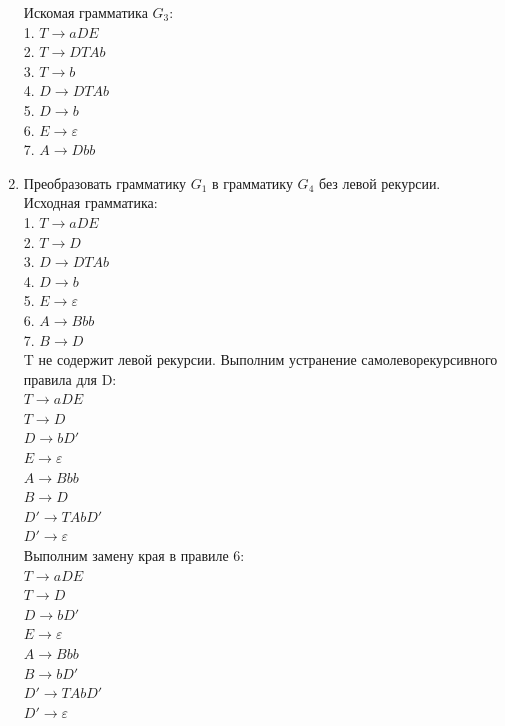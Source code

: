 \documentclass[a4paper,14pt]{extarticle}
\begin{document}
\begin{enumerate}[1.]
Искомая грамматика $G_3$:\\
1. $T \rightarrow aDE$\\
2. $T \rightarrow DTAb$\\
3. $T \rightarrow b$\\
4. $D \rightarrow DTAb$\\
5. $D \rightarrow b$\\
6. $E \rightarrow \varepsilon$\\
7. $A \rightarrow Dbb$\\

\item Преобразовать грамматику $G_1$ в грамматику $G_4$ без левой рекурсии.\\

Исходная грамматика:\\
1. $T \rightarrow aDE$\\
2. $T \rightarrow D$\\
3. $D \rightarrow DTAb$\\
4. $D \rightarrow b$\\
5. $E \rightarrow \varepsilon$\\
6. $A \rightarrow Bbb$\\
7. $B \rightarrow D$\\

T не содержит левой рекурсии. Выполним устранение самолеворекурсивного правила для D:\\
$T \rightarrow aDE$\\
$T \rightarrow D$\\
$D \rightarrow bD'$\\
$E \rightarrow \varepsilon$\\
$A \rightarrow Bbb$\\
$B \rightarrow D$\\
$D' \rightarrow TAbD'$\\
$D' \rightarrow \varepsilon$\\

Выполним замену края в правиле 6:\\
$T \rightarrow aDE$\\
$T \rightarrow D$\\
$D \rightarrow bD'$\\
$E \rightarrow \varepsilon$\\
$A \rightarrow Bbb$\\
$B \rightarrow bD'$\\
$D' \rightarrow TAbD'$\\
$D' \rightarrow \varepsilon$\\


\end{enumerate}
\end{document}
